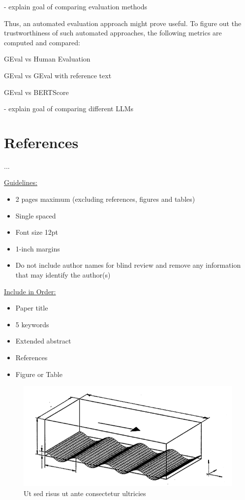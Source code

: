 \documentclass[a4paper,12pt]{article}
\begin{document}
- explain goal of comparing evaluation methods

Thus, an automated evaluation approach might prove useful. To figure out the trustworthiness of such automated approaches, the following metrics are computed and compared:

GEval vs Human Evaluation

GEval vs GEval with reference text

GEval vs BERTScore

- explain goal of comparing different LLMs

\section*{References}
...

\vskip 40pt
\underline {Guidelines:}
\begin{itemize}
\itemsep0pt
  \item 2 pages maximum (excluding references, figures and tables)
  \item Single spaced
  \item Font size 12pt
  \item 1-inch margins
  \item Do not include author names for blind review and remove any information that may identify the author(s)
\end{itemize}

\underline {Include in Order:}
\begin{itemize}
\itemsep0pt
  \item Paper title
  \item 5 keywords
  \item Extended abstract 
  \item References
  \item Figure or Table
\end{itemize}

\newpage

\begin{figure}[htp]
\centering
\includegraphics[width=14cm]{figexample.png}
\caption{Ut sed risus ut ante consectetur ultricies}
\label{fig:image}
\end{figure}
\end{document}
